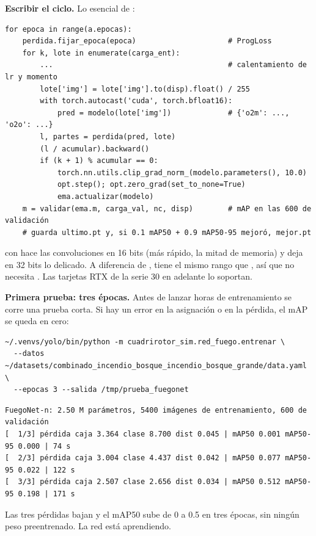  \textbf{Escribir el ciclo.}
Lo esencial de :
\begin{lstlisting}[style=py]
for epoca in range(a.epocas):
    perdida.fijar_epoca(epoca)                     # ProgLoss
    for k, lote in enumerate(carga_ent):
        ...                                        # calentamiento de lr y momento
        lote['img'] = lote['img'].to(disp).float() / 255
        with torch.autocast('cuda', torch.bfloat16):
            pred = modelo(lote['img'])             # {'o2m': ..., 'o2o': ...}
        l, partes = perdida(pred, lote)
        (l / acumular).backward()
        if (k + 1) % acumular == 0:
            torch.nn.utils.clip_grad_norm_(modelo.parameters(), 10.0)
            opt.step(); opt.zero_grad(set_to_none=True)
            ema.actualizar(modelo)
    m = validar(ema.m, carga_val, nc, disp)        # mAP en las 600 de validación
    # guarda ultimo.pt y, si 0.1 mAP50 + 0.9 mAP50-95 mejoró, mejor.pt
\end{lstlisting}

\begin{nota}
 con  hace las convoluciones en 16 bits (más
rápido, la mitad de memoria) y deja en 32 bits lo delicado. A diferencia de
,  tiene el mismo rango que , así que no
necesita . Las tarjetas RTX de la serie 30 en adelante lo
soportan.
\end{nota}

 \textbf{Primera prueba: tres épocas.}
Antes de lanzar horas de entrenamiento se corre una prueba corta. Si hay un error
en la asignación o en la pérdida, el mAP se queda en cero:
\begin{lstlisting}[style=bash]
~/.venvs/yolo/bin/python -m cuadrirotor_sim.red_fuego.entrenar \
  --datos ~/datasets/combinado_incendio_bosque_incendio_bosque_grande/data.yaml \
  --epocas 3 --salida /tmp/prueba_fuegonet
\end{lstlisting}
\begin{resultado}
\begin{lstlisting}
FuegoNet-n: 2.50 M parámetros, 5400 imágenes de entrenamiento, 600 de validación
[  1/3] pérdida caja 3.364 clase 8.700 dist 0.045 | mAP50 0.001 mAP50-95 0.000 | 74 s
[  2/3] pérdida caja 3.004 clase 4.437 dist 0.042 | mAP50 0.077 mAP50-95 0.022 | 122 s
[  3/3] pérdida caja 2.507 clase 2.656 dist 0.034 | mAP50 0.512 mAP50-95 0.198 | 171 s
\end{lstlisting}
Las tres pérdidas bajan y el mAP50 sube de 0 a 0.5 en tres épocas, sin ningún
peso preentrenado. La red está aprendiendo.
\end{resultado}


